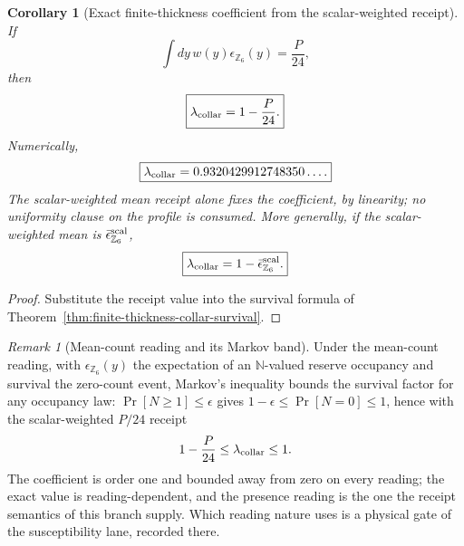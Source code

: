\documentclass[11pt]{article}
\newtheorem{corollary}[theorem]{Corollary}
\theoremstyle{remark}
\newtheorem{remark}[theorem]{Remark}
\theoremstyle{plain}
\begin{document}
\begin{corollary}[Exact finite-thickness coefficient from the scalar-weighted receipt]
\label{cor:finite-thickness-jensen-band}
If
\[
\int dy\,w(y)\epsilon_{\mathbb Z_6}(y)=\frac{P}{24},
\]
then
\[
\boxed{
\lambda_{\rm collar}=1-\frac{P}{24}.
}
\]
Numerically,
\[
\boxed{
\lambda_{\rm collar}
=
0.9320429912748350\ldots .
}
\]
The scalar-weighted mean receipt alone fixes the coefficient, by linearity; no
uniformity clause on the profile is consumed. More generally, if the
scalar-weighted mean is \(\bar\epsilon_{\mathbb Z_6}^{\rm scal}\),
\[
\boxed{
\lambda_{\rm collar}
=
1-\bar\epsilon_{\mathbb Z_6}^{\rm scal}.
}
\]
\end{corollary}

\begin{proof}
Substitute the receipt value into the survival formula of
Theorem~\ref{thm:finite-thickness-collar-survival}.
\end{proof}

\begin{remark}[Mean-count reading and its Markov band]
\label{rem:mean-count-markov-band}
Under the mean-count reading, with \(\epsilon_{\mathbb Z_6}(y)\) the
expectation of an \(\mathbb N\)-valued reserve occupancy and survival the
zero-count event, Markov's inequality bounds the survival factor for any
occupancy law: \(\Pr[N\ge1]\le\epsilon\) gives
\(1-\epsilon\le\Pr[N=0]\le1\), hence with the scalar-weighted \(P/24\) receipt
\[
1-\frac{P}{24}\le\lambda_{\rm collar}\le1.
\]
The coefficient is order one and bounded away from zero on every reading; the
exact value is reading-dependent, and the presence reading is the one the
receipt semantics of this branch supply. Which reading nature uses is a
physical gate of the susceptibility lane, recorded there.
\end{remark}
\end{document}

